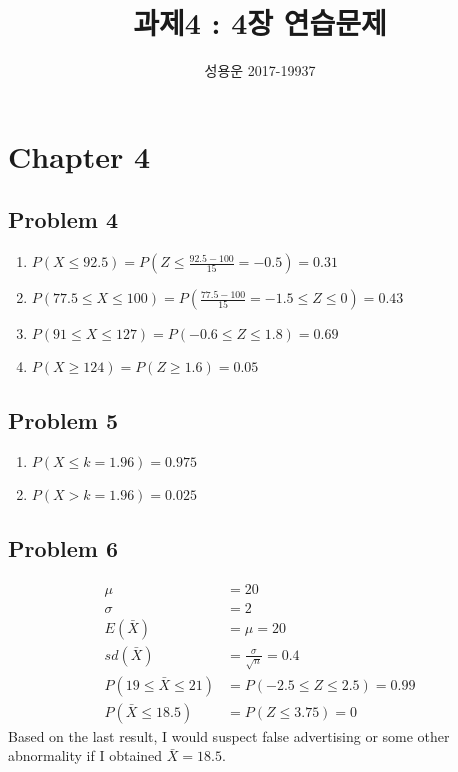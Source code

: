 \documentclass{article}
\title{과제4 : 4장 연습문제}
\author{성용운 2017-19937}
\date{}
\begin{document}
\maketitle

\section*{Chapter 4}

\subsection*{Problem 4}

\begin{enumerate}
	\item $P(X \le 92.5) = P(Z\le\frac{92.5-100}{15} = -0.5) = 0.31$
	\item $P(77.5\le X \le100) = P(\frac{77.5-100}{15} = -1.5 \le Z \le 0) = 0.43$
	\item $P(91 \le X \le 127) = P(-0.6 \le Z \le 1.8) = 0.69$
	\item $P(X \ge 124) = P(Z \ge 1.6) = 0.05$
\end{enumerate}

\subsection*{Problem 5}

\begin{enumerate}
	\item $P(X \le \boxed{k = 1.96}) = 0.975$
	\item $P(X > \boxed{k = 1.96}) = 0.025$
\end{enumerate}

\subsection*{Problem 6}

\begin{align*}
	\mu &= 20 \\
	\sigma &= 2 \\
	E(\bar{X}) &= \mu = 20 \\
	sd(\bar{X}) &= \frac{\sigma}{\sqrt{n}} = 0.4 \\
	P(19 \le \bar{X} \le 21) &= P(-2.5 \le Z \le 2.5) = 0.99 \\
	P(\bar{X} \le 18.5) &= P(Z \le 3.75) = 0
\end{align*}
Based on the last result, I would suspect false advertising or some other
abnormality if I obtained $\bar{X} = 18.5$.
\end{document}
